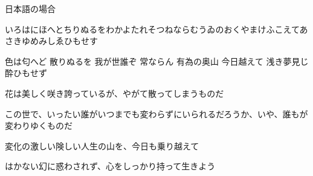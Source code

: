 \documentclass[aspectratio=169, xcolor={dvipsnames,table}]{beamer}
\begin{document}
  \begin{frame}[plain]{日本語の場合}
    \small

    {いろはにほへとちりぬるをわかよたれそつねならむうゐのおくやまけふこえてあさきゆめみしゑひもせす}\pause

    色は匂へど 散りぬるを 我が世誰ぞ 常ならん 有為の奥山 今日越えて 浅き夢見じ 酔ひもせず\pause

    \vfill

    \begin{tcolorbox}
      [title=現代語にすると] 花は美しく咲き誇っているが、やがて散ってしまうものだ

      この世で、いったい誰がいつまでも変わらずにいられるだろうか、いや、誰もが変わりゆくものだ

      変化の激しい険しい人生の山を、今日も乗り越えて

      はかない幻に惑わされず、心をしっかり持って生きよう
    \end{tcolorbox}
  \end{frame}
\end{document}
